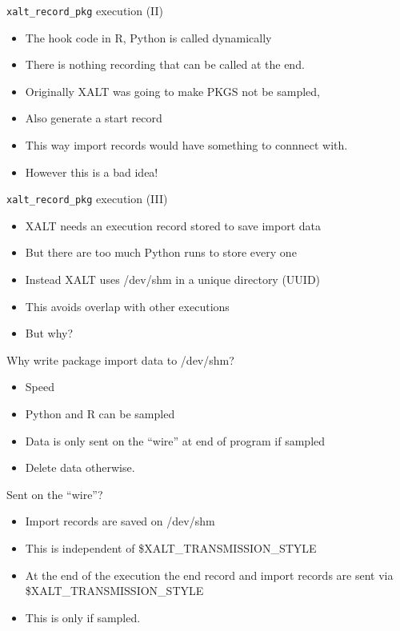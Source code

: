 \documentclass{beamer}
\begin{document}
\begin{frame}{\texttt{xalt\_record\_pkg} execution (II)}
  \begin{itemize}
    \item The hook code in R, Python is called dynamically
    \item There is nothing recording that can be called at the end.
    \item Originally XALT was going to make PKGS not be sampled,
    \item Also generate a start record
    \item This way import records would have something to connnect
      with.
    \item However this is a bad idea!
  \end{itemize}
\end{frame}

\begin{frame}{\texttt{xalt\_record\_pkg} execution (III)}
  \begin{itemize}
    \item XALT needs an execution record stored to save import data
    \item But there are too much Python runs to store every one
    \item Instead XALT uses /dev/shm in a unique directory (UUID)
    \item This avoids overlap with other executions
    \item But why?
  \end{itemize}
\end{frame}

\begin{frame}{Why write package import data to /dev/shm?}
  \begin{itemize}
    \item Speed
    \item Python and R can be sampled
    \item Data is only sent on the ``wire'' at end of program if sampled
    \item Delete data otherwise.
  \end{itemize}
\end{frame}

\begin{frame}{Sent on the ``wire''?}
  \begin{itemize}
    \item Import records are saved on /dev/shm
    \item This is independent of \$XALT\_TRANSMISSION\_STYLE
    \item At the end of the execution the end record and import
      records are sent via \$XALT\_TRANSMISSION\_STYLE
    \item This is only if sampled.
  \end{itemize}
\end{frame}
\end{document}
